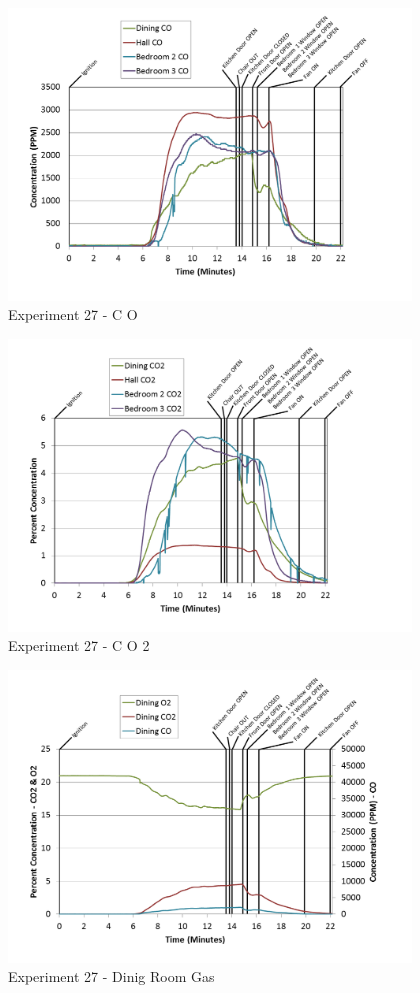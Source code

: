 \documentclass{article}
\begin{document}
\begin{appendices}
\begin{figure}[h!]
	\centering
	\includegraphics[height=3.05in]{0_Images/Results_Charts/Exp_27_Charts/CO.png}
	\caption{Experiment 27 - C O}
\end{figure}

\clearpage

\begin{figure}[h!]
	\centering
	\includegraphics[height=3.05in]{0_Images/Results_Charts/Exp_27_Charts/CO2.png}
	\caption{Experiment 27 - C O 2}
\end{figure}


\begin{figure}[h!]
	\centering
	\includegraphics[height=3.05in]{0_Images/Results_Charts/Exp_27_Charts/DinigRoomGas.png}
	\caption{Experiment 27 - Dinig Room Gas}
\end{figure}


\end{appendices}
\end{document}
